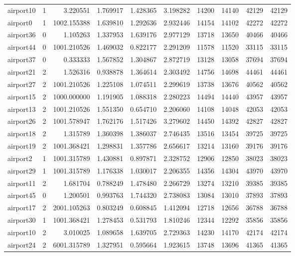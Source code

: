 \begin{longtable}{|l|r|r|r|r|r|r|r|r|r|}
airport10 & 1 & 3.220551 & 1.769917 & 1.428365 & 3.198282 & 14200 & 14140 & 42129 & 42129 \\
airport0 & 1 & 1002.155388 & 1.639810 & 1.292636 & 2.932446 & 14154 & 14102 & 42272 & 42272 \\
airport36 & 0 & 1.105263 & 1.337953 & 1.639176 & 2.977129 & 13718 & 13650 & 40466 & 40466 \\
airport44 & 0 & 1001.210526 & 1.469032 & 0.822177 & 2.291209 & 11578 & 11520 & 33115 & 33115 \\
airport37 & 0 & 0.333333 & 1.567852 & 1.304867 & 2.872719 & 13128 & 13058 & 37694 & 37694 \\
airport21 & 2 & 1.526316 & 0.938878 & 1.364614 & 2.303492 & 14756 & 14698 & 44461 & 44461 \\
airport27 & 2 & 1001.210526 & 1.225108 & 1.074511 & 2.299619 & 13738 & 13676 & 40562 & 40562 \\
airport15 & 2 & 1000.000000 & 1.191905 & 1.088318 & 2.280223 & 14494 & 14440 & 43957 & 43957 \\
airport13 & 2 & 1001.210526 & 1.551350 & 0.654710 & 2.206060 & 14108 & 14048 & 42053 & 42053 \\
airport26 & 2 & 1001.578947 & 1.762176 & 1.517426 & 3.279602 & 14450 & 14392 & 42827 & 42827 \\
airport18 & 2 & 1.315789 & 1.360398 & 1.386037 & 2.746435 & 13516 & 13454 & 39725 & 39725 \\
airport19 & 2 & 1001.368421 & 1.298831 & 1.357786 & 2.656617 & 13214 & 13160 & 39176 & 39176 \\
airport2 & 1 & 1001.315789 & 1.430881 & 0.897871 & 2.328752 & 12906 & 12850 & 38023 & 38023 \\
airport29 & 1 & 1001.315789 & 1.176338 & 1.030017 & 2.206355 & 14356 & 14304 & 43970 & 43970 \\
airport11 & 2 & 1.681704 & 0.788249 & 1.478480 & 2.266729 & 13274 & 13210 & 39385 & 39385 \\
airport45 & 0 & 1.200501 & 0.993763 & 1.744320 & 2.738083 & 13084 & 13010 & 37893 & 37893 \\
airport17 & 2 & 2001.105263 & 0.803249 & 0.608845 & 1.412094 & 12718 & 12656 & 36788 & 36788 \\
airport30 & 1 & 1001.368421 & 1.278453 & 0.531793 & 1.810246 & 12344 & 12292 & 35856 & 35856 \\
airport10 & 2 & 3.010025 & 1.089658 & 1.639705 & 2.729363 & 14230 & 14170 & 42174 & 42174 \\
airport24 & 2 & 6001.315789 & 1.327951 & 0.595664 & 1.923615 & 13748 & 13696 & 41365 & 41365 \\

\end{longtable}
